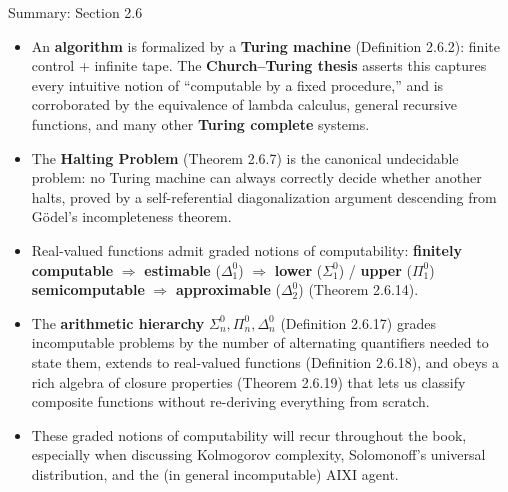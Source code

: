 \documentclass[aspectratio=169,10pt]{beamer}
\begin{document}
\begin{frame}{Summary: Section 2.6}
  \begin{itemize}
    \item An \textbf{algorithm} is formalized by a \textbf{Turing machine}
      (Definition 2.6.2): finite control + infinite tape. The
      \textbf{Church--Turing thesis} asserts this captures every intuitive
      notion of ``computable by a fixed procedure,'' and is corroborated by
      the equivalence of lambda calculus, general recursive functions, and
      many other \textbf{Turing complete} systems.
    \item The \textbf{Halting Problem} (Theorem 2.6.7) is the canonical
      undecidable problem: no Turing machine can always correctly decide
      whether another halts, proved by a self-referential diagonalization
      argument descending from Gödel's incompleteness theorem.
    \item Real-valued functions admit graded notions of computability:
      \textbf{finitely computable} $\Rightarrow$ \textbf{estimable}
      ($\Delta_1^0$) $\Rightarrow$ \textbf{lower} ($\Sigma_1^0$) /
      \textbf{upper} ($\Pi_1^0$) \textbf{semicomputable} $\Rightarrow$
      \textbf{approximable} ($\Delta_2^0$) (Theorem 2.6.14).
    \item The \textbf{arithmetic hierarchy} $\Sigma_n^0, \Pi_n^0, \Delta_n^0$
      (Definition 2.6.17) grades incomputable problems by the number of
      alternating quantifiers needed to state them, extends to real-valued
      functions (Definition 2.6.18), and obeys a rich algebra of closure
      properties (Theorem 2.6.19) that lets us classify composite functions
      without re-deriving everything from scratch.
    \item These graded notions of computability will recur throughout the
      book, especially when discussing Kolmogorov complexity, Solomonoff's
      universal distribution, and the (in general incomputable) AIXI agent.
  \end{itemize}
\end{frame}
\end{document}
